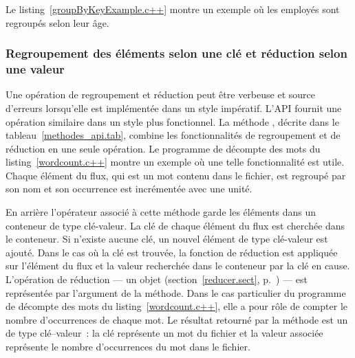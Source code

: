 Le listing~\ref{groupByKeyExample.c++} montre un exemple o\`u les employ\'es sont regroup\'es selon leur \^age.






\subsubsection{Regroupement des \'el\'ements selon une cl\'e et r\'eduction selon une valeur}

Une op\'eration de regroupement et r\'eduction peut \^etre verbeuse et source d'erreurs lorsqu'elle est impl\'ement\'ee dans un style imp\'eratif. L'{API} fournit une op\'eration similaire dans un style plus fonctionnel. La m\'ethode , d\'ecrite dans le tableau~\ref{methodes_api.tab}, combine les fonctionnalit\'es de regroupement et de r\'eduction en une seule op\'eration. Le programme de d\'ecompte des mots du listing~\ref{wordcount.c++} montre un exemple o\`u une telle fonctionnalit\'e est utile. Chaque \'el\'ement du flux, qui est un mot contenu dans le fichier, est regroup\'e par son nom et son occurrence est incr\'ement\'ee avec une unit\'e.

En arri\`ere l'opérateur  associ\'e \`a cette m\'ethode garde les \'el\'ements dans un conteneur de type cl\'e-valeur. La cl\'e de chaque \'el\'ement du flux est cherch\'ee dans le conteneur. Si n'existe aucune cl\'e, un nouvel \'el\'ement de type cl\'e-valeur est ajout\'e. Dans le cas o\`u la cl\'e est trouv\'ee, la fonction de r\'eduction est appliqu\'ee sur l'\'el\'ement du flux et la valeur recherch\'ee dans le conteneur par la cl\'e en cause. L'op\'eration de r\'eduction --- un objet  (section~\ref{reducer.sect}, p.~\pageref{reducer.sect})  --- est repr\'esent\'ee par l'argument de la m\'ethode. Dans le cas particulier du programme de d\'ecompte des mots du listing~\ref{wordcount.c++}, elle a pour r\^ole de compter le nombre d'occurrences de chaque mot. Le r\'esultat retourn\'e par la m\'ethode  est un  de type cl\'e--valeur~: la cl\'e repr\'esente un mot du fichier et la valeur associ\'ee repr\'esente le nombre d'occurrences du mot dans le fichier.


